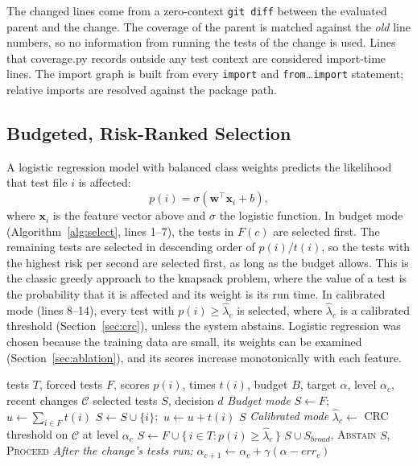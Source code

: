 \documentclass[conference]{IEEEtran}
\begin{document}
The changed lines come from a zero-context \texttt{git diff} between the evaluated parent and the change. The coverage of the parent is matched against the \emph{old} line numbers, so no information from running the tests of the change is used. Lines that coverage.py records outside any test context are considered import-time lines. The import graph is built from every \texttt{import} and \texttt{from}\ldots\texttt{import} statement; relative imports are resolved against the package path.

\subsection{Budgeted, Risk-Ranked Selection}\label{sec:select}
A logistic regression model with balanced class weights predicts the likelihood that test file $i$ is affected:
\begin{equation}
p(i) = \sigma\!\left(\mathbf{w}^{\top}\mathbf{x}_i + b\right), \label{eq:model}
\end{equation}
where $\mathbf{x}_i$ is the feature vector above and $\sigma$ the logistic function. In budget mode (Algorithm~\ref{alg:select}, lines 1--7), the tests in $F(c)$ are selected first. The remaining tests are selected in descending order of $p(i)/t(i)$, so the tests with the highest risk per second are selected first, as long as the budget allows. This is the classic greedy approach to the knapsack problem, where the value of a test is the probability that it is affected and its weight is its run time. In calibrated mode (lines 8--14), every test with $p(i)\ge\hat\lambda_c$ is selected, where $\hat\lambda_c$ is a calibrated threshold (Section~\ref{sec:crc}), unless the system abstains. Logistic regression was chosen because the training data are small, its weights can be examined (Section~\ref{sec:ablation}), and its scores increase monotonically with each feature.

\begin{algorithm}[t]
\caption{Risk-ranked selection with calibrated abstention}
\label{alg:select}
\begin{algorithmic}[1]
\Require tests $T$, forced tests $F$, scores $p(i)$, times $t(i)$, budget $B$, target $\alpha$, level $\alpha_c$, recent changes $\mathcal{C}$
\Ensure selected tests $S$, decision $d$
\Statex \textit{Budget mode}
\State $S \gets F$;\ $u \gets \sum_{i\in F} t(i)$
    \State $S \gets S \cup \{i\}$;\ $u \gets u + t(i)$
  \EndIf
\EndFor
\State \Return $S$
\Statex \textit{Calibrated mode}
\State $\hat\lambda_c \gets$ CRC threshold on $\mathcal{C}$ at level $\alpha_c$ 
\State $S \gets F \cup \{\, i \in T : p(i) \ge \hat\lambda_c \,\}$
 
  \State \Return $S \cup S_{\mathit{broad}}$, \textsc{Abstain} 
\EndIf
\State \Return $S$, \textsc{Proceed}
\Statex \textit{After the change's tests run:} $\alpha_{c+1} \gets \alpha_c + \gamma(\alpha - \mathit{err}_c)$
\end{algorithmic}
\end{algorithm}
\end{document}
